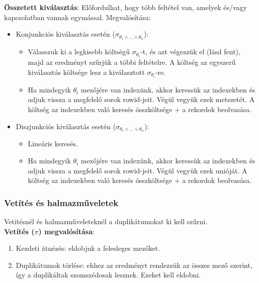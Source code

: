 \documentclass[margin=0px]{article}
\begin{document}
	\noindent \textbf{Összetett kiválasztás}: Előfordulhat, hogy több feltétel van, amelyek és/vagy kapcsolatban vannak egymással.
	Megvalósítása:
	\begin{itemize}
		\item	Konjunkciós kiválasztás esetén ($\sigma_{\theta_{1} \wedge ... \wedge \theta_{n}}$): 
		\begin{itemize}
			\item	Válasszuk ki a legkisebb költségű $\sigma_{\theta_{i}}$-t, és azt végezzük el (lásd fent),
			majd az eredményt szűrjük a többi feltételre. A költség az egyszerű kiválasztás költsége lesz a kiválasztott $\sigma_{\theta_{i}}$-re.
			
			\item	Ha mindegyik $\theta_{i}$ mezőjére van indexünk, akkor keressük az indexekben és adjuk vissza a megfelelő
			sorok rowid-jeit. Végül vegyük ezek metszetét. A költség az indexekben való keresés összköltsége + a rekordok beolvasása.
		\end{itemize}
		
		\item	Diszjunkciós kiválasztás esetén ($\sigma_{\theta_{1} \vee ... \vee \theta_{n}}$):
		\begin{itemize}
			\item	Lineáris keresés.
				
			\item	Ha mindegyik $\theta_{i}$ mezőjére van indexünk, akkor keressük az indexekben és adjuk vissza a megfelelő
			sorok rowid-jeit. Végül vegyük ezek unióját. A költség az indexekben való keresés összköltsége + a rekordok beolvasása.
			\end{itemize}
	\end{itemize}
	
	\subsubsection{Vetítés és halmazműveletek}
	
	Vetítésnél és halmazműveleteknél a duplikátumokat ki kell szűrni.\\
	
	\noindent \textbf{Vetítés ($\pi$) megvalósítása}:
	
	\begin{enumerate}
		\item	Kezdeti átnézés: eldobjuk a felesleges mezőket.
		\item	Duplikátumok törlése: ehhez az eredményt rendezzük az összes mező szerint, így a duplikáltak szomszédosak
		lesznek. Ezeket kell eldobni.
	\end{enumerate}
	
\end{document}
